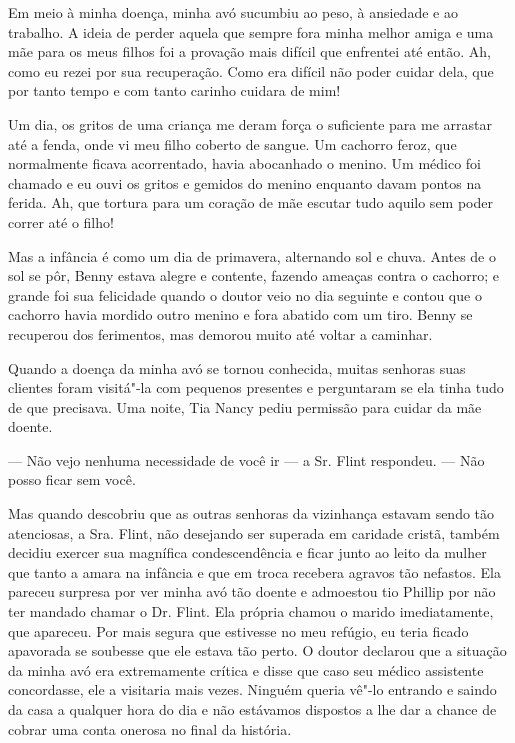 Em meio à minha doença, minha avó
sucumbiu ao peso, à ansiedade e ao trabalho. A ideia de perder aquela
que sempre fora minha melhor amiga e uma mãe para os meus filhos foi a
provação mais difícil que enfrentei até então. Ah, como eu rezei por sua
recuperação. Como era difícil não poder cuidar dela, que por tanto tempo
e com tanto carinho cuidara de mim!

Um dia, os gritos de uma criança me
deram força o suficiente para me arrastar até a fenda, onde vi meu filho
coberto de sangue. Um cachorro feroz, que normalmente ficava
acorrentado, havia abocanhado o menino. Um médico foi chamado e eu ouvi
os gritos e gemidos do menino enquanto davam pontos na ferida. Ah, que
tortura para um coração de mãe escutar tudo aquilo sem poder correr até
o filho!

Mas a infância é como um dia de
primavera, alternando sol e chuva. Antes de o sol se pôr, Benny estava
alegre e contente, fazendo ameaças contra o cachorro; e grande foi sua
felicidade quando o doutor veio no dia seguinte e contou que o cachorro
havia mordido outro menino e fora abatido com um tiro. Benny se
recuperou dos ferimentos, mas demorou muito até voltar a caminhar.

Quando a doença da minha avó se tornou
conhecida, muitas senhoras suas clientes foram visitá"-la com pequenos
presentes e perguntaram se ela tinha tudo de que precisava. Uma noite,
Tia Nancy pediu permissão para cuidar da mãe doente.

--- Não vejo nenhuma necessidade de você ir --- a Sr. Flint respondeu.
--- Não posso ficar sem você.

Mas quando descobriu que as outras senhoras da vizinhança estavam sendo
tão atenciosas, a Sra. Flint, não desejando ser superada em caridade
cristã, também decidiu exercer sua magnífica condescendência e ficar
junto ao leito da mulher que tanto a amara na infância e que em troca
recebera agravos tão nefastos. Ela pareceu surpresa por ver minha avó
tão doente e admoestou tio Phillip por não ter mandado chamar o Dr.
Flint. Ela própria chamou o marido imediatamente, que apareceu. Por mais
segura que estivesse no meu refúgio, eu teria ficado apavorada se
soubesse que ele estava tão perto. O doutor declarou que a situação da
minha avó era extremamente crítica e disse que caso seu médico
assistente concordasse, ele a visitaria mais vezes. Ninguém queria vê"-lo
entrando e saindo da casa a qualquer hora do dia e não estávamos
dispostos a lhe dar a chance de cobrar uma conta onerosa no final da
história.

